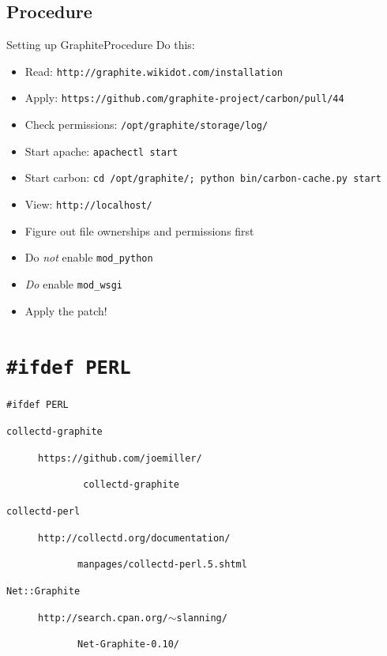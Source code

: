\documentclass[smaller]{beamer} %
\begin{document}
\subsection{Procedure}
\begin{frame}{Setting up Graphite}{Procedure}
    Do this:
    \begin{itemize}
        \item Read:                 {\tt http://graphite.wikidot.com/installation}
        \item Apply:                {\tt https://github.com/graphite-project/carbon/pull/44}
        \item Check permissions:    {\tt /opt/graphite/storage/log/}
        \item Start apache:         {\tt apachectl start}
        \item Start carbon:         {\tt cd /opt/graphite/; python bin/carbon-cache.py start}
        \item View:                 {\tt http://localhost/}
    \end{itemize}

    \vskip10pt
    \begin{itemize}
        \item<3-> Figure out file ownerships and permissions first
        \item<4-> Do {\it not} enable {\tt mod\_python}
        \item<5-> {\it Do} enable {\tt mod\_wsgi}
        \item<6-> Apply the patch!
    \end{itemize}
\end{frame}

\section{\tt\#ifdef PERL}
\begin{frame}{\tt\#ifdef PERL}
    \def\cdfiller{}
    \begin{description}
        \item[\tt collectd-graphite]
        \item[]                             {\tt https://github.com/joemiller/}
        \item[]                             {\tt \ \ \ \ \ \ \ \ collectd-graphite}
        \item[\tt collectd-perl]
        \item[]                             {\tt http://collectd.org/documentation/}
        \item[]                             {\tt \ \ \ \ \ \ \ manpages/collectd-perl.5.shtml}
        \item[\tt Net::Graphite]
        \item[]                             {\tt http://search.cpan.org/${\sim}$slanning/}
        \item[]                             {\tt \ \ \ \ \ \ \ Net-Graphite-0.10/}
    \end{description}
\end{frame}
\end{document}
